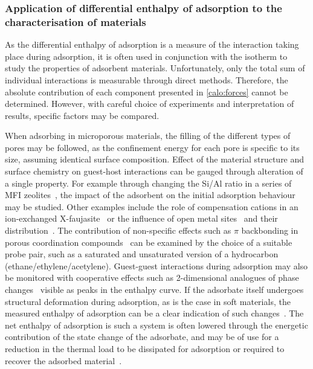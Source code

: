 \subsubsection{Application of differential enthalpy of adsorption to the characterisation of materials}

As the differential enthalpy of adsorption is a measure
of the interaction taking place during adsorption, it is often
used in conjunction with the isotherm to study the properties
of adsorbent materials.
Unfortunately, only the total sum of individual interactions
is measurable through direct methods. Therefore, the
absolute contribution of each component presented in
\autoref{calo:forces} cannot be determined.
However, with careful choice of experiments and interpretation
of results, specific factors may be compared.

When adsorbing in microporous materials, the filling of the
different types of pores may be followed, as the confinement
energy for each pore is specific to its size, assuming identical
surface composition.
Effect of the material structure and surface chemistry
on guest-host interactions can be gauged through alteration of
a single property. For example through changing the Si/Al ratio
in a series of MFI zeolites~\cite{llewellynAdsorptionMFItypeZeolites1993},
the impact of the adsorbent on the initial adsorption behaviour
may be studied.
Other examples include the role of compensation cations in an
ion-exchanged X-faujasite~\cite{maurinAdsorptionArgonNitrogen2005, %
	maurinInfluenceExtraFrameworkCations2005}
or the influence of open metal sites~\cite{grajciarUnderstandingCOAdsorption2011}
and their distribution~\cite{yoonControlledReducibilityMetalOrganic2010}.
The contribution of non-specific effects such as \( \pi \)
backbonding in porous coordination compounds~\cite{rubesAdsorptionPropanePropylene2013}
can be examined by the choice of a suitable probe pair, such as a saturated
and unsaturated version of a hydrocarbon (ethane/ethylene/acetylene).
Guest-guest interactions during adsorption may also be monitored
with cooperative effects such as 2-dimensional analogues of phase
changes~\cite{rouquerolCalorimetricEvidenceBidimensional1977}
visible as peaks in the enthalpy curve.
If the adsorbate itself undergoes structural deformation during adsorption,
as is the case in soft materials, the measured enthalpy of
adsorption can be a clear indication of such
changes~\cite{bourrellyDifferentAdsorptionBehaviors2005}.
The net enthalpy of adsorption is such a system is often
lowered through the energetic contribution of the state
change of the adsorbate, and may be of use for a reduction in
the thermal load to be dissipated for adsorption or required to
recover the adsorbed material~\cite{masonMethaneStorageFlexible2015}.

